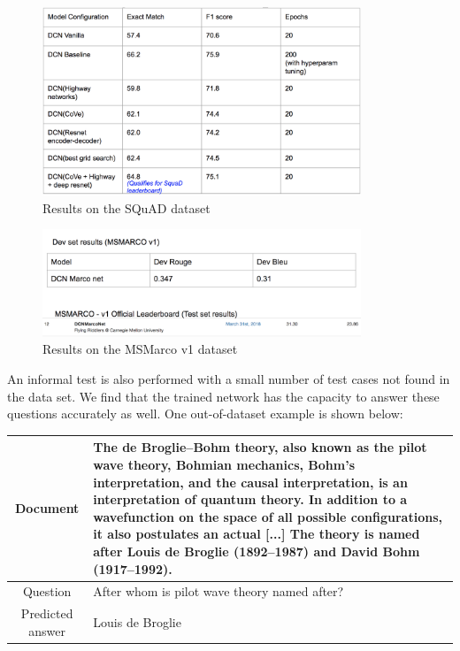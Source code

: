 \begin{figure}[h]
    \centering
    \includegraphics[width=0.85\textwidth]{images/res_squad.png}
    \caption{Results on the SQuAD dataset}
    \label{im:squad_res}
\end{figure}

\begin{figure}[h]
    \centering
    \includegraphics[width=0.85\textwidth]{images/res_marco.png}
    \caption{Results on the MSMarco v1 dataset}
    \label{im:res_marco}
\end{figure}


An informal test is also performed with a small number of test cases not found in the data set. We find that the trained network has the capacity to answer these questions accurately as well. One out-of-dataset example is shown below:

\begin{table}
\begin{tabular}{|c|p{}|}
    \hline
    Document & The de Broglie–Bohm theory, also known as the pilot wave theory, Bohmian mechanics, Bohm's interpretation, and the causal interpretation, is an interpretation of quantum theory. In addition to a wavefunction on the space of all possible configurations, it also postulates an actual [...] The theory is named after Louis de Broglie (1892–1987) and David Bohm (1917–1992). \\
    \hline
    Question & After whom is pilot wave theory named after? \\
    \hline
    Predicted answer & Louis de Broglie \\
    \hline
\end{tabular}
\end{table}

